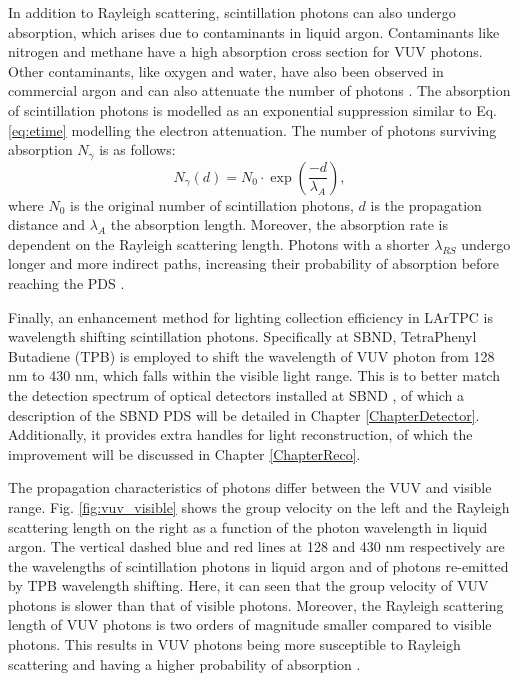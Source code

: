 
In addition to Rayleigh scattering, scintillation photons can also undergo absorption, which arises due to contaminants in liquid argon.
Contaminants like nitrogen \cite{photon_nitrogen} and methane \cite{photon_methane} have a high absorption cross section for VUV photons.
Other contaminants, like oxygen and water, have also been observed in commercial argon and can also attenuate the number of photons \cite{photon_commercial}. 
The absorption of scintillation photons is modelled as an exponential suppression similar to Eq. \ref{eq:etime} modelling the electron attenuation.
The number of photons surviving absorption $N_\gamma$ is as follows:
\begin{equation}
	N_{\gamma} (d) = N_0 \cdot \exp\left(\frac{-d}{\lambda_{A}}\right),
\label{eq:absorption}
\end{equation}
where $N_0$ is the original number of scintillation photons, $d$ is the propagation distance and $\lambda_A$ the absorption length.
Moreover, the absorption rate is dependent on the Rayleigh scattering length. 
Photons with a shorter $\lambda_{RS}$ undergo longer and more indirect paths, increasing their probability of absorption before reaching the PDS \cite{PatrickPhD}.



Finally, an enhancement method for lighting collection efficiency in LArTPC is wavelength shifting scintillation photons.
Specifically at SBND, TetraPhenyl Butadiene (TPB) is employed to shift the wavelength of VUV photon from 128 nm to 430 nm, which falls within the visible light range.
This is to better match the detection spectrum of optical detectors installed at SBND \cite{sbnd_pds_paper}, of which a description of the SBND PDS will be detailed in Chapter \ref{ChapterDetector}.
Additionally, it provides extra handles for light reconstruction, of which the improvement will be discussed in Chapter \ref{ChapterReco}.

The propagation characteristics of photons differ between the VUV and visible range.
Fig. \ref{fig:vuv_visible} shows the group velocity on the left and the Rayleigh scattering length on the right as a function of the photon wavelength in liquid argon.
The vertical dashed blue and red lines at 128 and 430 nm respectively are the wavelengths of scintillation photons in liquid argon and of photons re-emitted by TPB wavelength shifting. 
Here, it can seen that the group velocity of VUV photons is slower than that of visible photons.
Moreover, the Rayleigh scattering length of VUV photons is two orders of magnitude smaller compared to visible photons.
This results in VUV photons being more susceptible to Rayleigh scattering and having a higher probability of absorption \cite{PatrickPhD}.

